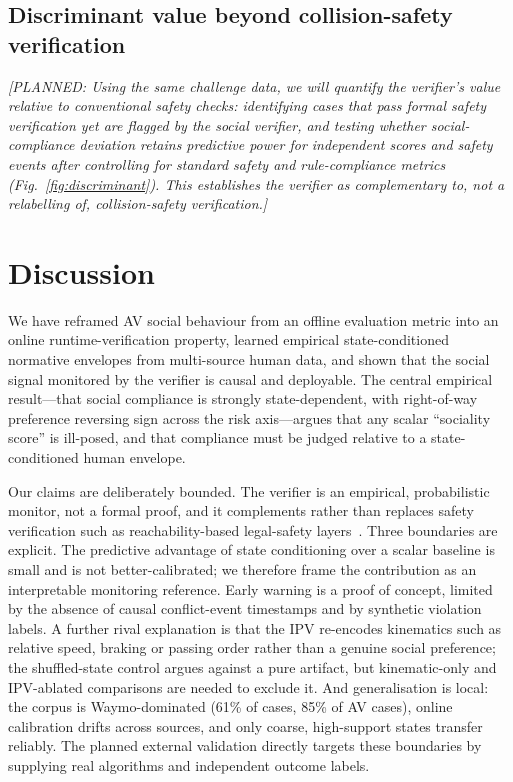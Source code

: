 \documentclass[12pt,a4paper]{article}
\newcommand{\planned}[1]{{\color{blue!60!black}\textit{[PLANNED: #1]}}}
\begin{document}
\subsection{Discriminant value beyond collision-safety verification}
\planned{Using the same challenge data, we will quantify the verifier's value relative to
conventional safety checks: identifying cases that pass formal safety verification yet are
flagged by the social verifier, and testing whether social-compliance deviation retains
predictive power for independent scores and safety events after controlling for standard
safety and rule-compliance metrics (Fig.~\ref{fig:discriminant}). This establishes the
verifier as complementary to, not a relabelling of, collision-safety verification.}

\section{Discussion}
We have reframed AV social behaviour from an offline evaluation metric into an online
runtime-verification property, learned empirical state-conditioned normative envelopes from
multi-source human data, and shown that the social signal monitored by the verifier is
causal and deployable. The central empirical result---that social compliance is strongly
state-dependent, with right-of-way preference reversing sign across the risk axis---argues
that any scalar ``sociality score'' is ill-posed, and that compliance must be judged
relative to a state-conditioned human envelope.

Our claims are deliberately bounded. The verifier is an empirical, probabilistic monitor,
not a formal proof, and it complements rather than replaces safety verification such as
reachability-based legal-safety layers~\cite{pek2020online}. Three boundaries are explicit.
The predictive advantage of state conditioning over a scalar baseline is small and is not
better-calibrated; we therefore frame the contribution as an interpretable monitoring
reference. Early warning is a proof of concept, limited by the absence of causal
conflict-event timestamps and by synthetic violation labels. A further rival explanation is
that the IPV re-encodes kinematics such as relative speed, braking or passing order rather
than a genuine social preference; the shuffled-state control argues against a pure artifact,
but kinematic-only and IPV-ablated comparisons are needed to exclude it. And generalisation is local:
the corpus is Waymo-dominated (61\% of cases, 85\% of AV cases), online calibration drifts
across sources, and only coarse, high-support states transfer reliably. The planned
external validation directly targets these boundaries by supplying real algorithms and
independent outcome labels.
\end{document}
